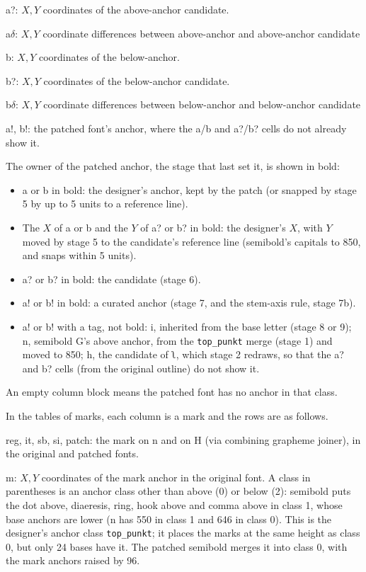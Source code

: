 \documentclass[landscape]{article}
\begin{document}
a?: $X, Y$ coordinates of the above-anchor candidate.

a$\delta$: $X, Y$ coordinate differences between above-anchor and above-anchor candidate

b: $X, Y$ coordinates of the below-anchor.

b?: $X, Y$ coordinates of the below-anchor candidate.

b$\delta$: $X, Y$ coordinate differences between below-anchor and below-anchor candidate

a!, b!: the patched font's anchor, where the a/b and a?/b? cells do not already show it.

The owner of the patched anchor, the stage that last set it, is shown in bold:
\begin{itemize}
	\item a or b in bold: the designer's anchor, kept by the patch (or snapped by stage 5 by up to 5 units to a reference line).
	\item The $X$ of a or b and the $Y$ of a? or b? in bold: the designer's $X$, with $Y$ moved by stage 5 to the candidate's reference line (semibold's capitals to 850, and snaps within 5 units).
	\item a? or b? in bold: the candidate (stage 6).
	\item a! or b! in bold: a curated anchor (stage 7, and the stem-axis rule, stage 7b).
	\item a! or b! with a tag, not bold: i, inherited from the base letter (stage 8 or 9);
	n, semibold G's above anchor, from the \verb|top_punkt| merge (stage 1) and moved to 850;
	h, the candidate of ʅ, which stage 2 redraws, so that the a? and b? cells (from the original outline) do not show it.
\end{itemize}
An empty column block means the patched font has no anchor in that class.

In the tables of marks, each column is a mark and the rows are as follows.

reg, it, sb, si, patch: the mark on n and on H (via combining grapheme joiner), 
in the original and patched fonts.

m: $X, Y$ coordinates of the mark anchor in the original font.
A class in parentheses is an anchor class other than above (0) or below (2): 
semibold puts the dot above, diaeresis, ring, hook above and comma above in class 1, 
whose base anchors are lower (n has 550 in class 1 and 646 in class 0).
This is the designer's anchor class \verb|top_punkt|; it places the marks at the same height as class 0, 
but only 24 bases have it. The patched semibold merges it into class 0, with the mark anchors raised by 96.
\end{document}

